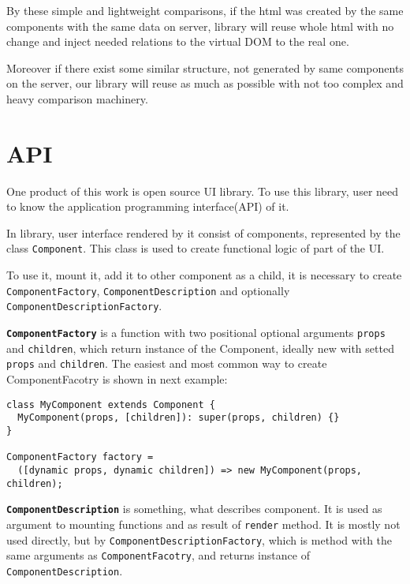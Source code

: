 \documentclass[oneside, 12pt]{book}
\begin{document}
    By these simple and lightweight comparisons, if the html was created by the same components with the same data on server, 
    library will reuse whole html with no change and inject needed relations to the virtual DOM to the real one. 

    Moreover if there exist some similar structure, not generated by same components on the server, 
    our library will reuse as much as possible with not too complex and heavy comparison machinery.

\section{API}\label{sec:our-api}

  One product of this work is open source UI library.
  To use this library, user need to know the application programming interface(API) of it. 

  In \tiles library, user interface rendered by it consist of components, represented by the class \texttt{Component}. 
  This class is used to create functional logic of part of the UI. 

  To use it, mount it, add it to other component as a child, it is necessary to create \texttt{ComponentFactory}, 
  \texttt{ComponentDescription} and optionally \texttt{ComponentDescriptionFactory}.

  \textbf{\texttt{ComponentFactory}} is a function with two positional optional arguments \texttt{props} and \texttt{children}, 
  which return instance of the Component, ideally new with setted \texttt{props} and \texttt{children}.
  The easiest and most common way to create ComponentFacotry is shown in next example:
\begin{verbatim}
class MyComponent extends Component {
  MyComponent(props, [children]): super(props, children) {}
}

ComponentFactory factory = 
  ([dynamic props, dynamic children]) => new MyComponent(props, children);
\end{verbatim}



  \textbf{\texttt{ComponentDescription}} is something, what describes component. 
  It is used as argument to mounting functions and as result of \texttt{render} method.
  It is mostly not used directly, but by \texttt{ComponentDescriptionFactory}, 
  which is method with the same arguments as \texttt{ComponentFacotry}, and returns instance of \texttt{ComponentDescription}.
\end{document}
